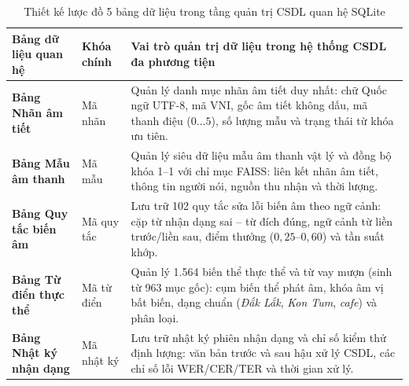 \documentclass[12pt,a4paper]{article}
\begin{document}
\begin{table}[!htbp]
\centering
\caption{Thiết kế lược đồ 5 bảng dữ liệu trong tầng quản trị CSDL quan hệ SQLite}
\label{tab:sqlite_schema}
\setlength{\tabcolsep}{3.5pt}
\begin{tabularx}{\linewidth}{l C{2.35cm} Y}
\toprule
Bảng dữ liệu quan hệ & Khóa chính & Vai trò quản trị dữ liệu trong hệ thống CSDL đa phương tiện \\
\midrule
\textbf{Bảng Nhãn âm tiết} & Mã nhãn & Quản lý danh mục nhãn âm tiết duy nhất: chữ Quốc ngữ UTF-8, mã VNI, gốc âm tiết không dấu, mã thanh điệu ($0\dots 5$), số lượng mẫu và trạng thái từ khóa ưu tiên. \\
\textbf{Bảng Mẫu âm thanh} & Mã mẫu & Quản lý siêu dữ liệu mẫu âm thanh vật lý và đồng bộ khóa 1--1 với chỉ mục FAISS: liên kết nhãn âm tiết, thông tin người nói, nguồn thu nhận và thời lượng. \\
\textbf{Bảng Quy tắc biến âm} & Mã quy tắc & Lưu trữ 102 quy tắc sửa lỗi biến âm theo ngữ cảnh: cặp từ nhận dạng sai -- từ đích đúng, ngữ cảnh từ liền trước/liền sau, điểm thưởng ($0{,}25\text{--}0{,}60$) và tần suất khớp. \\
\textbf{Bảng Từ điển thực thể} & Mã từ điển & Quản lý 1.564 biến thể thực thể và từ vay mượn (sinh từ 963 mục gốc): cụm biến thể phát âm, khóa âm vị bất biến, dạng chuẩn (\textit{Đắk Lắk}, \textit{Kon Tum}, \textit{cafe}) và phân loại. \\
\textbf{Bảng Nhật ký nhận dạng} & Mã nhật ký & Lưu trữ nhật ký phiên nhận dạng và chỉ số kiểm thử định lượng: văn bản trước và sau hậu xử lý CSDL, các chỉ số lỗi WER/CER/TER và thời gian xử lý. \\
\bottomrule
\end{tabularx}
\end{table}
\end{document}
